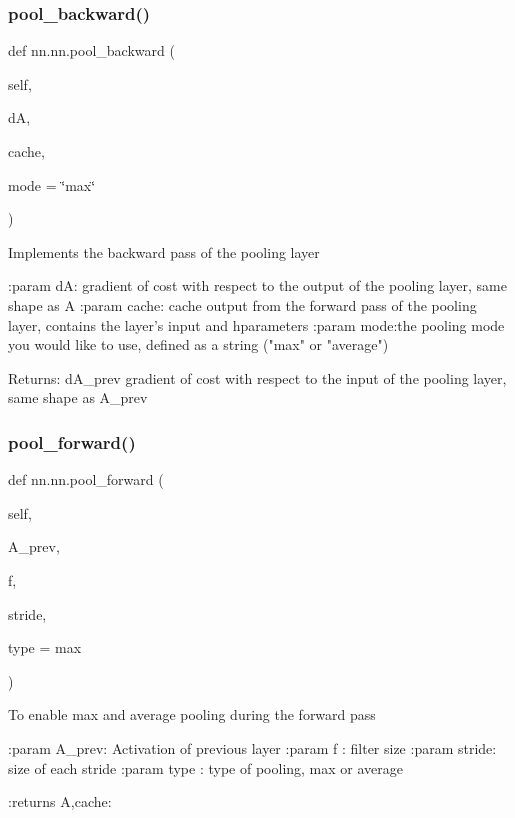 \subsubsection{\texorpdfstring{pool\+\_\+backward()}{pool\_backward()}}
{\footnotesize\ttfamily def nn.\+nn.\+pool\+\_\+backward (\begin{DoxyParamCaption}\item[{}]{self,  }\item[{}]{dA,  }\item[{}]{cache,  }\item[{}]{mode = {\ttfamily \char`\"{}max\char`\"{}} }\end{DoxyParamCaption})}

\begin{DoxyVerb}Implements the backward pass of the pooling layer

:param dA: gradient of cost with respect to the output of the pooling layer, same shape as A
:param cache: cache output from the forward pass of the pooling layer, contains the layer's input and hparameters 
:param mode:the pooling mode you would like to use, defined as a string ("max" or "average")

Returns:
dA_prev  gradient of cost with respect to the input of the pooling layer, same shape as A_prev
\end{DoxyVerb}
 \mbox{\label{classnn_1_1nn_a41278f302aa3d60fae1b5812d3ad3e5c}} 
\subsubsection{\texorpdfstring{pool\+\_\+forward()}{pool\_forward()}}
{\footnotesize\ttfamily def nn.\+nn.\+pool\+\_\+forward (\begin{DoxyParamCaption}\item[{}]{self,  }\item[{}]{A\+\_\+prev,  }\item[{}]{f,  }\item[{}]{stride,  }\item[{}]{type = {\ttfamily \textquotesingle{}max\textquotesingle{}} }\end{DoxyParamCaption})}

\begin{DoxyVerb}To enable max and average pooling during the forward pass

:param A_prev: Activation of previous layer
:param   f   : filter size
:param stride: size of each stride
:param type  : type of pooling, max or average

:returns A,cache:
\end{DoxyVerb}
 \mbox{\label{classnn_1_1nn_a0d8bdf9cacca85758429cebaa17336ef}} 
